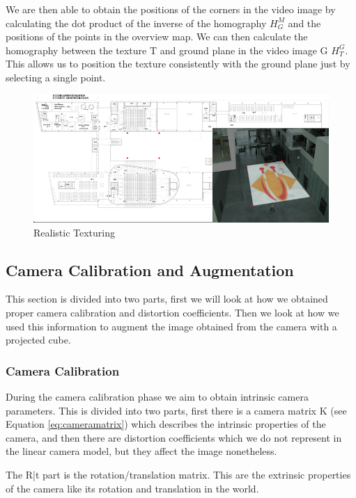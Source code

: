 We are then able to obtain the positions of the corners in the video image by calculating the dot product of the inverse of the homography $H_{G}^{M}$ and the positions of the points in the overview map. We can then calculate the homography between the texture T and ground plane in the video image G $H_{T}^{G}$. This allows us to position the texture consistently with the ground plane just by selecting a single point.

\begin{figure}[h!]
	\centering
	\includegraphics[width=\textwidth]{final/images/realistictexturing.png}
	\caption{Realistic Texturing}
	\label{fig:realistictexturing}
\end{figure}

\subsection{Camera Calibration and Augmentation}

This section is divided into two parts, first we will look at how we obtained proper camera calibration and distortion coefficients. Then we look at how we used this information to augment the image obtained from the camera with a projected cube.

\subsubsection{Camera Calibration}

During the camera calibration phase we aim to obtain intrinsic camera parameters. This is divided into two parts, first there is a camera matrix K (see Equation \ref{eq:cameramatrix}) which describes the intrinsic properties of the camera, and then there are distortion coefficients which we do not represent in the linear camera model, but they affect the image nonetheless. 

The R|t part is the rotation/translation matrix. This are the extrinsic properties of the camera like its rotation and translation in the world.

